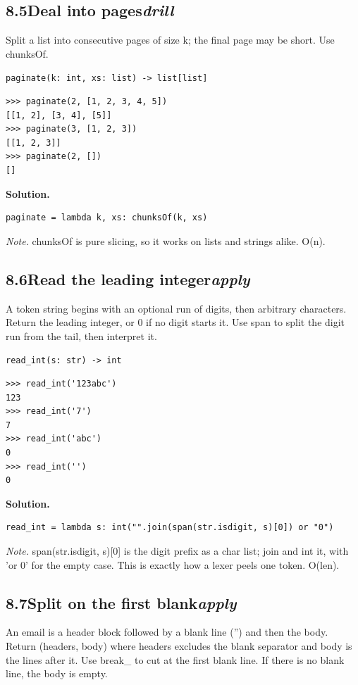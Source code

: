\documentclass[10pt,letterpaper]{book}
\begin{document}
\subsection*{8.5\quad Deal into pages\hfill\textnormal{\textit{drill}}}
Split a list into consecutive pages of size k; the final page may be short. Use chunksOf.

\noindent\texttt{paginate(k: int, xs: list) -> list[list]}
\begin{lstlisting}[style=ex]
>>> paginate(2, [1, 2, 3, 4, 5])
[[1, 2], [3, 4], [5]]
>>> paginate(3, [1, 2, 3])
[[1, 2, 3]]
>>> paginate(2, [])
[]
\end{lstlisting}
\noindent\textbf{Solution.}
\begin{lstlisting}[style=code]
paginate = lambda k, xs: chunksOf(k, xs)
\end{lstlisting}
\noindent\textit{Note.} chunksOf is pure slicing, so it works on lists and strings alike. O(n).

\subsection*{8.6\quad Read the leading integer\hfill\textnormal{\textit{apply}}}
A token string begins with an optional run of digits, then arbitrary characters. Return the leading integer, or 0 if no digit starts it. Use span to split the digit run from the tail, then interpret it.

\noindent\texttt{read\_int(s: str) -> int}
\begin{lstlisting}[style=ex]
>>> read_int('123abc')
123
>>> read_int('7')
7
>>> read_int('abc')
0
>>> read_int('')
0
\end{lstlisting}
\noindent\textbf{Solution.}
\begin{lstlisting}[style=code]
read_int = lambda s: int("".join(span(str.isdigit, s)[0]) or "0")
\end{lstlisting}
\noindent\textit{Note.} span(str.isdigit, s)[0] is the digit prefix as a char list; join and int it, with 'or 0' for the empty case. This is exactly how a lexer peels one token. O(len).

\subsection*{8.7\quad Split on the first blank\hfill\textnormal{\textit{apply}}}
An email is a header block followed by a blank line ('') and then the body. Return (headers, body) where headers excludes the blank separator and body is the lines after it. Use break\_ to cut at the first blank line. If there is no blank line, the body is empty.
\end{document}
